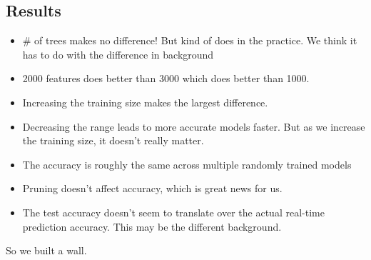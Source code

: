 
\subsection{Results}
\begin{itemize}
	\item \# of trees makes no difference! But kind of does in the practice. We think it has to do with the difference in background
	\item 2000 features does better than 3000 which does better than 1000.
	\item Increasing the training size makes the largest difference.
	\item Decreasing the range leads to more accurate models faster. But as we increase the training size, it doesn't really matter.
	\item The accuracy is roughly the same across multiple randomly trained models
	\item Pruning doesn't affect accuracy, which is great news for us.
	\item The test accuracy doesn't seem to translate over the actual real-time prediction accuracy. This may be the different background.
\end{itemize}

So we built a wall.